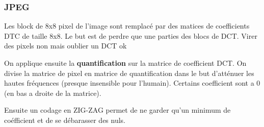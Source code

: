 \documentclass[12pt]{article}
\begin{document}
		\subsubsection{JPEG}
			Les block de 8x8 pixel de l'image sont remplacé par des matices de coefficients DTC de taille 8x8. Le but est de perdre que une parties des blocs de DCT. Virer des pixels non mais oublier un DCT ok
			
			On applique ensuite la \textbf{quantification} sur la matrice de coefficient DCT. On divise la matrice de pixel en matrice de quantification dans le but d'atténuer les hautes fréquences (presque insensible pour l'humain). Certains coefficient sont a 0 (en bas a droite de la matrice).
			
			Ensuite un codage en ZIG-ZAG permet de ne garder qu'un minimum de coéfficient et de se débarasser des nuls.
			
\end{document}
